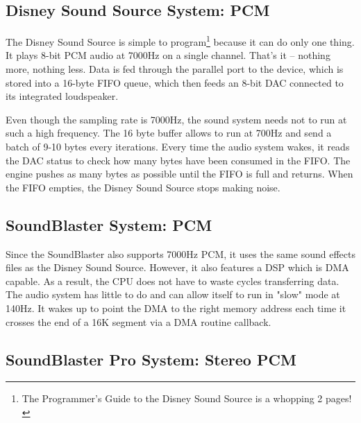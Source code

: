 \subsection{Disney Sound Source System: PCM}

The Disney Sound Source is simple to program\footnote{The Programmer's Guide to the Disney Sound Source is a whopping 2 pages!} because it can do only one thing. It plays 8-bit PCM audio at 7000Hz on a single channel. That's it -- nothing more, nothing less. Data is fed through the parallel port to the device, which is stored into a 16-byte FIFO queue, which then feeds an 8-bit DAC connected to its integrated loudspeaker.\\ 
\par
Even though the sampling rate is 7000Hz, the sound system needs not to run at such a high frequency. The 16 byte buffer allows to run at 700Hz and send a batch of 9-10 bytes every iterations. Every time the audio system wakes, it reads the DAC status to check how many bytes have been consumed in the FIFO. The engine pushes as many bytes as possible until the FIFO is full and returns. When the FIFO empties, the Disney Sound Source stops making noise.\\
\par










\par
\subsection{SoundBlaster System: PCM}
Since the SoundBlaster also supports 7000Hz PCM, it uses the same sound effects files as the Disney Sound Source. However, it also features a DSP which is DMA capable. As a result, the CPU does not have to waste cycles transferring data. The audio system has little to do and can allow itself to run in "slow" mode at 140Hz. It wakes up to point the DMA to the right memory address each time it crosses the end of a 16K segment via a DMA routine callback.\\
\par








\par
\subsection{SoundBlaster Pro System: Stereo PCM}
\par

